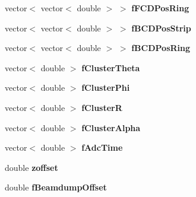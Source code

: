 \begin{DoxyCompactItemize}
\item 
\hypertarget{class_calibration_ac2f692c5e54aed9d508e63db2439855f}{vector$<$ vector$<$ double $>$ $>$ {\bfseries f\-F\-C\-D\-Pos\-Ring}}\label{class_calibration_ac2f692c5e54aed9d508e63db2439855f}

\item 
\hypertarget{class_calibration_a3a011b25d22e065da7cc0e758dc73d63}{vector$<$ vector$<$ double $>$ $>$ {\bfseries f\-B\-C\-D\-Pos\-Strip}}\label{class_calibration_a3a011b25d22e065da7cc0e758dc73d63}

\item 
\hypertarget{class_calibration_a76aaf9355d2e29501ddc97028d9cb02a}{vector$<$ vector$<$ double $>$ $>$ {\bfseries f\-B\-C\-D\-Pos\-Ring}}\label{class_calibration_a76aaf9355d2e29501ddc97028d9cb02a}

\item 
\hypertarget{class_calibration_a36c09ce185cc30ee60468f0aa5389cfc}{vector$<$ double $>$ {\bfseries f\-Cluster\-Theta}}\label{class_calibration_a36c09ce185cc30ee60468f0aa5389cfc}

\item 
\hypertarget{class_calibration_a10bc108b3509126dff358fc6de052441}{vector$<$ double $>$ {\bfseries f\-Cluster\-Phi}}\label{class_calibration_a10bc108b3509126dff358fc6de052441}

\item 
\hypertarget{class_calibration_a8955f576f03e78c846e62a86207493c8}{vector$<$ double $>$ {\bfseries f\-Cluster\-R}}\label{class_calibration_a8955f576f03e78c846e62a86207493c8}

\item 
\hypertarget{class_calibration_a8b7ad3ce59b00024a9380c1d752dcddc}{vector$<$ double $>$ {\bfseries f\-Cluster\-Alpha}}\label{class_calibration_a8b7ad3ce59b00024a9380c1d752dcddc}

\item 
\hypertarget{class_calibration_ad17489696497c9913e8fed070988fa28}{vector$<$ double $>$ {\bfseries f\-Adc\-Time}}\label{class_calibration_ad17489696497c9913e8fed070988fa28}

\item 
\hypertarget{class_calibration_ade913c7df571f0a30478efe4c9623de2}{double {\bfseries zoffset}}\label{class_calibration_ade913c7df571f0a30478efe4c9623de2}

\item 
\hypertarget{class_calibration_abecda979659e8f0a7768f9969fb143fe}{double {\bfseries f\-Beamdump\-Offset}}\label{class_calibration_abecda979659e8f0a7768f9969fb143fe}


\end{DoxyCompactItemize}
